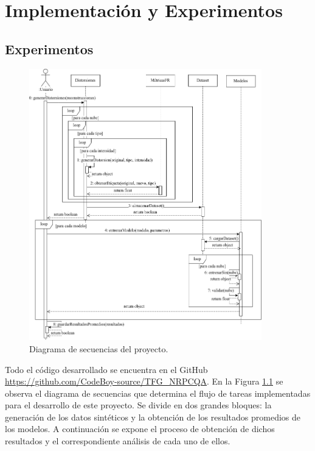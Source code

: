 \chapter{Implementación y Experimentos} 
\section{Experimentos} 

\begin{figure}[H]
  \begin{center}
    \includegraphics[width=0.90\textwidth]{imagenes/chapter5/TFGSequence}
  \end{center}
  \caption{Diagrama de secuencias del proyecto.}
  \label{fig:TFGSequence}
\end{figure}

Todo el código desarrollado se encuentra 
en el GitHub \url{https://github.com/CodeBoy-source/TFG_NRPCQA}.
En la Figura \ref{fig:TFGSequence} se observa el diagrama de secuencias 
que determina el flujo de tareas implementadas para el desarrollo de este proyecto. 
Se divide en dos grandes bloques: la generación de los datos sintéticos y 
la obtención de los resultados promedios de los modelos. A continuación 
se expone el proceso de obtención de dichos resultados y el correspondiente
análisis de cada uno de ellos. 

